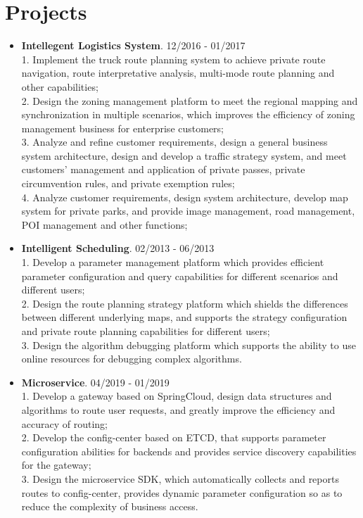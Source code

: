\documentclass[letterpaper, UTF8]{article}
\begin{document}
	\section*{\textbf{Projects}}
	\begin{itemize}
		\item \textbf{Intellegent Logistics System}. 12/2016 - 01/2017\\
		1. Implement the truck route planning system to achieve private route navigation, route interpretative analysis, multi-mode route planning and other capabilities;\\
		2. Design the zoning management platform to meet the regional mapping and synchronization in multiple scenarios, which improves the efficiency of zoning management business for enterprise customers;\\
		3. Analyze and refine customer requirements, design a general business system architecture, design and develop a traffic strategy system, and meet customers' management and application of private passes, private circumvention rules, and private exemption rules;\\
		4. Analyze customer requirements, design system architecture, develop map system for private parks, and provide image management, road management, POI management and other functions;
		
		\item \textbf{Intelligent Scheduling}. 02/2013 - 06/2013\\
		1. Develop a parameter management platform which provides efficient parameter configuration and query capabilities for different scenarios and different users;\\
		2. Design the route planning strategy platform which shields the differences between different underlying maps, and supports the strategy configuration and private route planning capabilities for different users; \\
		3. Design the algorithm debugging platform which supports the ability to use online resources for debugging complex algorithms.
		
		\item \textbf{Microservice}. 04/2019 - 01/2019\\
		1. Develop a gateway based on SpringCloud, design data structures and algorithms to route user requests, and greatly improve the efficiency and accuracy of routing; \\
		2. Develop the config-center based on ETCD, that supports parameter configuration abilities for backends and provides service discovery capabilities for the gateway; \\
		3. Design the microservice SDK, which automatically collects and reports routes to config-center, provides dynamic parameter configuration so as to reduce the complexity of business access.
		

\end{itemize}
\end{document}
